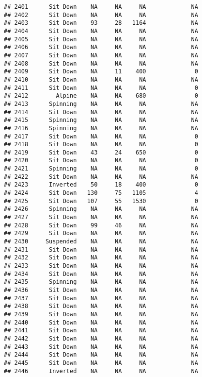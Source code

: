 \documentclass[
]{article}
\begin{document}
\begin{verbatim}
## 2401      Sit Down    NA     NA     NA             NA
## 2402      Sit Down    NA     NA     NA             NA
## 2403      Sit Down    93     28   1164             NA
## 2404      Sit Down    NA     NA     NA             NA
## 2405      Sit Down    NA     NA     NA             NA
## 2406      Sit Down    NA     NA     NA             NA
## 2407      Sit Down    NA     NA     NA             NA
## 2408      Sit Down    NA     NA     NA             NA
## 2409      Sit Down    NA     11    400              0
## 2410      Sit Down    NA     NA     NA             NA
## 2411      Sit Down    NA     NA     NA              0
## 2412        Alpine    NA     NA    680              0
## 2413      Spinning    NA     NA     NA             NA
## 2414      Sit Down    NA     NA     NA             NA
## 2415      Spinning    NA     NA     NA             NA
## 2416      Spinning    NA     NA     NA             NA
## 2417      Sit Down    NA     NA     NA              0
## 2418      Sit Down    NA     NA     NA              0
## 2419      Sit Down    43     24    650              0
## 2420      Sit Down    NA     NA     NA              0
## 2421      Spinning    NA     NA     NA              0
## 2422      Sit Down    NA     NA     NA             NA
## 2423      Inverted    50     18    400              0
## 2424      Sit Down   130     75   1105              4
## 2425      Sit Down   107     55   1530              0
## 2426      Spinning    NA     NA     NA             NA
## 2427      Sit Down    NA     NA     NA             NA
## 2428      Sit Down    99     46     NA             NA
## 2429      Sit Down    NA     NA     NA             NA
## 2430     Suspended    NA     NA     NA             NA
## 2431      Sit Down    NA     NA     NA             NA
## 2432      Sit Down    NA     NA     NA             NA
## 2433      Sit Down    NA     NA     NA             NA
## 2434      Sit Down    NA     NA     NA             NA
## 2435      Spinning    NA     NA     NA             NA
## 2436      Sit Down    NA     NA     NA             NA
## 2437      Sit Down    NA     NA     NA             NA
## 2438      Sit Down    NA     NA     NA             NA
## 2439      Sit Down    NA     NA     NA             NA
## 2440      Sit Down    NA     NA     NA             NA
## 2441      Sit Down    NA     NA     NA             NA
## 2442      Sit Down    NA     NA     NA             NA
## 2443      Sit Down    NA     NA     NA             NA
## 2444      Sit Down    NA     NA     NA             NA
## 2445      Sit Down    NA     NA     NA             NA
## 2446      Inverted    NA     NA     NA             NA

\end{verbatim}
\end{document}
